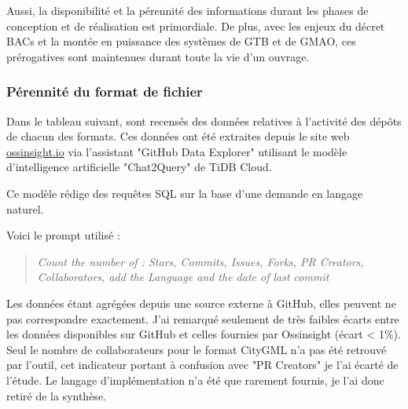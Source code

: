 Aussi, la disponibilité et la pérennité des informations durant les phases de conception et de réalisation est primordiale. De plus, avec les enjeux du décret BACs et la montée en puissance des systèmes de GTB et de GMAO, ces prérogatives sont maintenues durant toute la vie d'un ouvrage. 

\subsubsection{Pérennité du format de fichier}

Dans le tableau suivant, sont recensés des données relatives à l'activité des dépôts de chacun des formats. 
Ces données ont été extraites depuis le site web \href{https://ossinsight.io}{ossinsight.io} via l'assistant "GitHub Data Explorer" utilisant le modèle d'intelligence artificielle "Chat2Query" de TiDB Cloud.

Ce modèle rédige des requêtes SQL sur la base d'une demande en langage naturel.

Voici le prompt utilisé : 

\begin{quote}
    \textit{Count the number of : Stars, Commits, Issues, Forks, PR Creators, Collaborators, add the Language and the date of last commit}
\end{quote}

Les données étant agrégées depuis une source externe à GitHub, elles peuvent ne pas correspondre exactement. J'ai remarqué seulement de très faibles écarts entre les données disponibles sur GitHub et celles fournies par Ossinsight (écart < 1\%). Seul le nombre de collaborateurs pour le format CityGML n'a pas été retrouvé par l'outil, cet indicateur portant à confusion avec "PR Creators" je l'ai écarté de l'étude.
Le langage d'implémentation n'a été que rarement fournis, je l'ai donc retiré de la synthèse.

